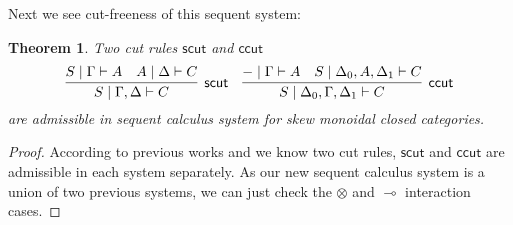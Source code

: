\documentclass[submission,copyright,creativecommons]{eptcs}
\newtheorem{theorem}{Theorem}
\newcommand{\ot}{\otimes}
\newcommand{\lolli}{\multimap}
\begin{document}
Next we see cut-freeness of this sequent system:
\begin{theorem}
Two cut rules $\mathsf{scut}$ and $\mathsf{ccut}$
  \begin{displaymath}
    \infer[\mathsf{scut}]{S \mid \Gamma , \Delta \vdash C}{
      S \mid \Gamma \vdash A
      &
      A \mid \Delta \vdash C
    }
    \quad
    \infer[\mathsf{ccut}]{S \mid \Delta_0 , \Gamma , \Delta_1 \vdash C}{
      - \mid \Gamma \vdash A
      &
      S \mid \Delta_0 , A , \Delta_1 \vdash C
    }
  \end{displaymath}
  are admissible in sequent calculus system for skew monoidal closed categories.
\end{theorem}
\begin{proof}
  According to previous works \cite{uustalu:sequent:2018} and \cite{uustalu:deductive:nodate} we know two cut rules, $\mathsf{scut}$ and $\mathsf{ccut}$ are admissible in each system separately.
  As our new sequent calculus system is a union of two previous systems, we can just check the $\ot$ and $\lolli$ interaction cases.


\end{proof}
\end{document}
